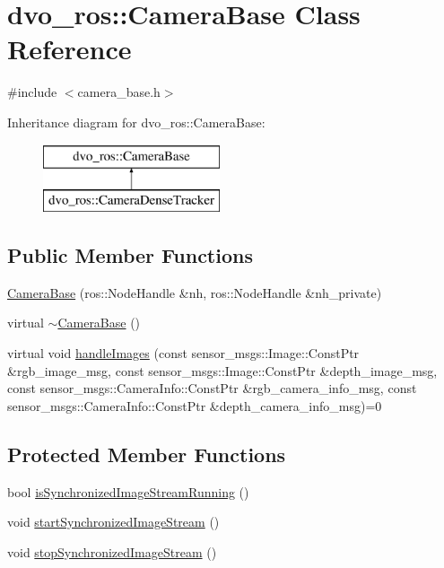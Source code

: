 \hypertarget{classdvo__ros_1_1_camera_base}{}\section{dvo\+\_\+ros\+:\+:Camera\+Base Class Reference}
\label{classdvo__ros_1_1_camera_base}


{\ttfamily \#include $<$camera\+\_\+base.\+h$>$}

Inheritance diagram for dvo\+\_\+ros\+:\+:Camera\+Base\+:\begin{figure}[H]
\begin{center}
\leavevmode
\includegraphics[height=2.000000cm]{classdvo__ros_1_1_camera_base}
\end{center}
\end{figure}
\subsection*{Public Member Functions}
\begin{DoxyCompactItemize}
\item 
\mbox{\hyperlink{classdvo__ros_1_1_camera_base_af3d3ae6aaad83055c752c114b2100104}{Camera\+Base}} (ros\+::\+Node\+Handle \&nh, ros\+::\+Node\+Handle \&nh\+\_\+private)
\item 
virtual \mbox{\hyperlink{classdvo__ros_1_1_camera_base_a022e9f3ea3010cf84bad64fa63f8e1b0}{$\sim$\+Camera\+Base}} ()
\item 
virtual void \mbox{\hyperlink{classdvo__ros_1_1_camera_base_aa8c983ab1bb8383aae1f375ea6808120}{handle\+Images}} (const sensor\+\_\+msgs\+::\+Image\+::\+Const\+Ptr \&rgb\+\_\+image\+\_\+msg, const sensor\+\_\+msgs\+::\+Image\+::\+Const\+Ptr \&depth\+\_\+image\+\_\+msg, const sensor\+\_\+msgs\+::\+Camera\+Info\+::\+Const\+Ptr \&rgb\+\_\+camera\+\_\+info\+\_\+msg, const sensor\+\_\+msgs\+::\+Camera\+Info\+::\+Const\+Ptr \&depth\+\_\+camera\+\_\+info\+\_\+msg)=0
\end{DoxyCompactItemize}
\subsection*{Protected Member Functions}
\begin{DoxyCompactItemize}
\item 
bool \mbox{\hyperlink{classdvo__ros_1_1_camera_base_aca6d7ca1b4238565841cdab72e807765}{is\+Synchronized\+Image\+Stream\+Running}} ()
\item 
void \mbox{\hyperlink{classdvo__ros_1_1_camera_base_a00bdd483ef57eec8a4991c65fef30974}{start\+Synchronized\+Image\+Stream}} ()
\item 
void \mbox{\hyperlink{classdvo__ros_1_1_camera_base_a45929acddbac65ab20b3c0a0b9fb567a}{stop\+Synchronized\+Image\+Stream}} ()
\end{DoxyCompactItemize}
